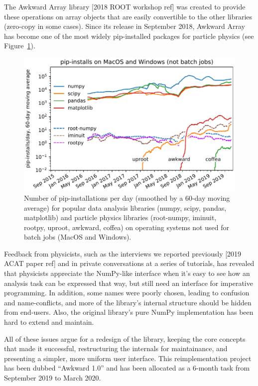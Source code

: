 \documentclass{webofc}
\begin{document}
The Awkward Array library [2018 ROOT workshop ref] was created to provide these operations on array objects that are easily convertible to the other libraries (zero-copy in some cases). Since its release in September 2018, Awkward Array has become one of the most widely pip-installed packages for particle physics (see Figure~\ref{fig:pip-timeline}).

\begin{figure}
\begin{center}
\includegraphics[width=0.75\linewidth]{pip-timeline.pdf}
\end{center}

\vspace{-0.25 cm}
\caption{Number of pip-installations per day (smoothed by a 60-day moving average) for popular data analysis libraries (numpy, scipy, pandas, matplotlib) and particle physics libraries (root-numpy, iminuit, rootpy, uproot, awkward, coffea) on operating systems not used for batch jobs (MacOS and Windows). \label{fig:pip-timeline}}
\end{figure}

Feedback from physicists, such as the interviews we reported previously [2019 ACAT paper ref] and in private conversations at a series of tutorials, has revealed that physicists appreciate the NumPy-like interface when it's easy to see how an analysis task can be expressed that way, but still need an interface for imperative programming. In addition, some names were poorly chosen, leading to confusion and name-conflicts, and more of the library's internal structure should be hidden from end-users. Also, the original library's pure NumPy implementation has been hard to extend and maintain.

All of these issues argue for a redesign of the library, keeping the core concepts that made it successful, restructuring the internals for maintainance, and presenting a simpler, more uniform user interface. This reimplementation project has been dubbed ``Awkward 1.0'' and has been allocated as a 6-month task from September 2019 to March 2020.
\end{document}
